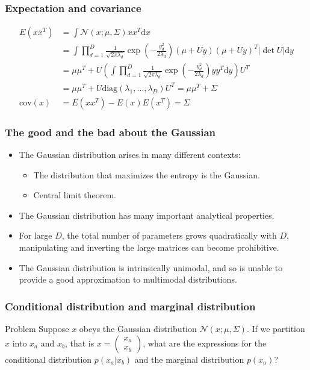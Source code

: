 \documentclass{beamer}
\begin{document}
\begin{frame}
    \frametitle{Expectation and covariance}
    \begin{align*}
        E(xx^{T})&=\int\mathcal{N}(x;\mu,\Sigma)xx^{T}\mathrm{d}x \\
        &=\int\prod_{d=1}^{D}\frac{1}{\sqrt{2\pi\lambda_{d}}}\exp(-\frac{y_{d}^{2}}{2\lambda_{d}})(\mu+Uy)(\mu+Uy)^{T}|\det{}U|\mathrm{d}y \\
        &=\mu\mu^{T}+U(\int\prod_{d=1}^{D}\frac{1}{\sqrt{2\pi\lambda_{d}}}\exp(-\frac{y_{d}^{2}}{2\lambda_{d}})yy^{T}\mathrm{d}y)U^{T} \\
        &=\mu\mu^{T}+U\mathrm{diag}(\lambda_{1},\hdots,\lambda_{D})U^{T}=\mu\mu^{T}+\Sigma \\
        \mathrm{cov}(x)&=E(xx^{T})-E(x)E(x^{T})=\Sigma
    \end{align*}
\end{frame}

\begin{frame}
    \frametitle{The good and the bad about the Gaussian}
    \begin{itemize}
        \item The Gaussian distribution arises in many different contexts:
        \begin{itemize}
            \item The distribution that maximizes the entropy is the Gaussian.
            \item Central limit theorem.
        \end{itemize}
        \item The Gaussian distribution has many important analytical properties.
        \item For large $D$, the total number of parameters grows quadratically with $D$, manipulating and inverting the large matrices can become prohibitive.
        \item The Gaussian distribution is intrinsically unimodal, and so is unable to provide a good approximation to multimodal distributions.
    \end{itemize}
\end{frame}

\begin{frame}
    \frametitle{Conditional distribution and marginal distribution}
    \begin{block}{Problem}
        Suppose $x$ obeys the Gaussian distribution $\mathcal{N}(x;\mu,\Sigma)$. If we partition $x$ into $x_{a}$ and $x_{b}$, that is $x=\begin{pmatrix}
            x_{a} \\
            x_{b}
        \end{pmatrix}$, what are the expressions for the conditional distribution $p(x_{a}|x_{b})$ and the marginal distribution $p(x_{a})$?
    \end{block}
\end{frame}
\end{document}
